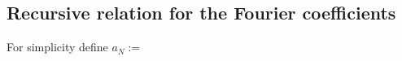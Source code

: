 \documentclass[11pt,a4paper, 
swedish, english %
]{article}
\begin{document}
\subsection{Recursive relation for the Fourier coefficients}
For simplicity define $a_N:=$














\end{document}
